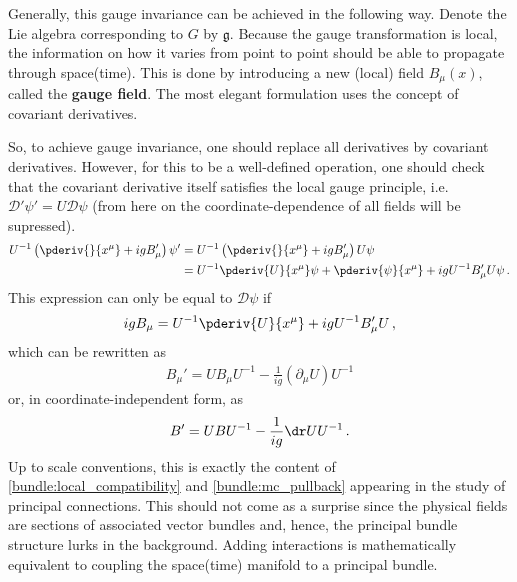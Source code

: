     Generally, this gauge invariance can be achieved in the following way. Denote the Lie algebra corresponding to $G$ by $\mathfrak{g}$. Because the gauge transformation is local, the information on how it varies from point to point should be able to propagate through space(time). This is done by introducing a new (local) field $B_\mu(x)$, called the \textbf{gauge field}. The most elegant formulation uses the concept of covariant derivatives.

    So, to achieve gauge invariance, one should replace all derivatives by covariant derivatives. However, for this to be a well-defined operation, one should check that the covariant derivative itself satisfies the local gauge principle, i.e.~$\mathcal{D}'\psi'=U\mathcal{D}\psi$ (from here on the coordinate-dependence of all fields will be supressed).
    \begin{align}
        U^{-1}\left(\pderiv{}{x^\mu} + igB_\mu'\right)\psi' &= U^{-1}\left(\pderiv{}{x^\mu} + igB_\mu'\right)U\psi\nonumber\\
        &= U^{-1}\pderiv{U}{x^\mu}\psi + \pderiv{\psi}{x^\mu} + igU^{-1}B_\mu'U\psi\,.
    \end{align}
    This expression can only be equal to $\mathcal{D}\psi$ if
    \begin{gather}
        igB_\mu = U^{-1}\pderiv{U}{x^\mu} + igU^{-1}B_\mu'U\,,
    \end{gather}
    which can be rewritten as
    \begin{gather}
        B_\mu' = UB_\mu U^{-1} - \frac{1}{ig}(\partial_\mu U)U^{-1}
    \end{gather}
    or, in coordinate-independent form, as
    \begin{gather}
        B' = UBU^{-1} - \frac{1}{ig}\dr UU^{-1}\,.
    \end{gather}
    Up to scale conventions, this is exactly the content of \cref{bundle:local_compatibility} and \cref{bundle:mc_pullback} appearing in the study of principal connections. This should not come as a surprise since the physical fields are sections of associated vector bundles and, hence, the principal bundle structure lurks in the background. Adding interactions is mathematically equivalent to coupling the space(time) manifold to a principal bundle.

